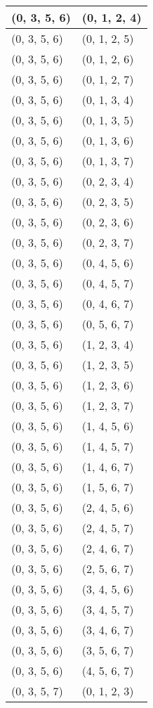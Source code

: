 \begin{footnotesize}
\begin{longtable}[c]{|l|l|}
(0, 3, 5, 6)
&(0, 1, 2, 4)
\\ \hline
(0, 3, 5, 6)
&(0, 1, 2, 5)
\\ \hline
(0, 3, 5, 6)
&(0, 1, 2, 6)
\\ \hline
(0, 3, 5, 6)
&(0, 1, 2, 7)
\\ \hline
(0, 3, 5, 6)
&(0, 1, 3, 4)
\\ \hline
(0, 3, 5, 6)
&(0, 1, 3, 5)
\\ \hline
(0, 3, 5, 6)
&(0, 1, 3, 6)
\\ \hline
(0, 3, 5, 6)
&(0, 1, 3, 7)
\\ \hline
(0, 3, 5, 6)
&(0, 2, 3, 4)
\\ \hline
(0, 3, 5, 6)
&(0, 2, 3, 5)
\\ \hline
(0, 3, 5, 6)
&(0, 2, 3, 6)
\\ \hline
(0, 3, 5, 6)
&(0, 2, 3, 7)
\\ \hline
(0, 3, 5, 6)
&(0, 4, 5, 6)
\\ \hline
(0, 3, 5, 6)
&(0, 4, 5, 7)
\\ \hline
(0, 3, 5, 6)
&(0, 4, 6, 7)
\\ \hline
(0, 3, 5, 6)
&(0, 5, 6, 7)
\\ \hline
(0, 3, 5, 6)
&(1, 2, 3, 4)
\\ \hline
(0, 3, 5, 6)
&(1, 2, 3, 5)
\\ \hline
(0, 3, 5, 6)
&(1, 2, 3, 6)
\\ \hline
(0, 3, 5, 6)
&(1, 2, 3, 7)
\\ \hline
(0, 3, 5, 6)
&(1, 4, 5, 6)
\\ \hline
(0, 3, 5, 6)
&(1, 4, 5, 7)
\\ \hline
(0, 3, 5, 6)
&(1, 4, 6, 7)
\\ \hline
(0, 3, 5, 6)
&(1, 5, 6, 7)
\\ \hline
(0, 3, 5, 6)
&(2, 4, 5, 6)
\\ \hline
(0, 3, 5, 6)
&(2, 4, 5, 7)
\\ \hline
(0, 3, 5, 6)
&(2, 4, 6, 7)
\\ \hline
(0, 3, 5, 6)
&(2, 5, 6, 7)
\\ \hline
(0, 3, 5, 6)
&(3, 4, 5, 6)
\\ \hline
(0, 3, 5, 6)
&(3, 4, 5, 7)
\\ \hline
(0, 3, 5, 6)
&(3, 4, 6, 7)
\\ \hline
(0, 3, 5, 6)
&(3, 5, 6, 7)
\\ \hline
(0, 3, 5, 6)
&(4, 5, 6, 7)
\\ \hline
(0, 3, 5, 7)
&(0, 1, 2, 3)
\\ \hline

\end{longtable}
\end{footnotesize}
